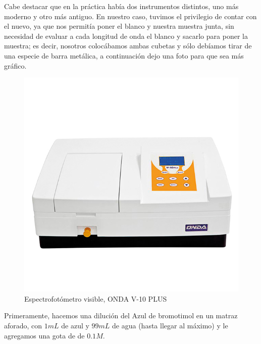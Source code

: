 
\noindent Cabe destacar que en la práctica había dos instrumentos distintos, uno más moderno y otro más antiguo. En nuestro caso, tuvimos el privilegio de contar con el nuevo, ya que nos permitía poner el blanco y nuestra muestra junta, sin necesidad de evaluar a cada longitud de onda el blanco y sacarlo para poner la muestra; es decir, nosotros colocábamos ambas cubetas y sólo debíamos tirar de una especie de barra metálica, a continuación dejo una foto para que sea más gráfico.

\vspace{0.4cm}

\begin{figure}[H]
    \centering
    \includegraphics[scale = 0.2]{fotos/SPTR-V01-001.jpg}
    \caption{Espectrofotómetro visible, ONDA V-10 PLUS}
    \label{fig:cris}
\end{figure}

\vspace{0.4cm}


\noindent Primeramente, hacemos una dilución del Azul de bromotimol en un matraz aforado, con $1 mL$ de azul y $99 mL$ de agua (hasta llegar al máximo) y le agregamos una gota de de  $0.1M$.\\

